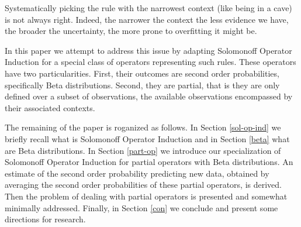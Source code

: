 \documentclass[runningheads]{llncs}
\begin{document}
Systematically picking the rule with the narrowest context (like being
in a cave) is not always right. Indeed, the narrower the context the
less evidence we have, the broader the uncertainty, the more prone to
overfitting it might be.


In this paper we attempt to address this issue by adapting Solomonoff
Operator Induction \cite{Solomonoff08Three} for a special class of
operators representing such rules. These operators have two
particularities. First, their outcomes are second order probabilities,
specifically Beta distributions. Second, they are partial, that is
they are only defined over a subset of observations, the available
observations encompassed by their associated contexts.


The remaining of the paper is roganized as follows. In Section
\ref{sol-op-ind} we briefly recall what is Solomonoff Operator
Induction and in Section \ref{beta} what are Beta distributions. In
Section \ref{part-op} we introduce our specialization of Solomonoff
Operator Induction for partial operators with Beta distributions. An
estimate of the second order probability predicting new data, obtained
by averaging the second order probabilities of these partial
operators, is derived. Then the problem of dealing with partial
operators is presented and somewhat minimally addressed. Finally, in
Section \ref{con} we conclude and present some directions for
research.
\end{document}
